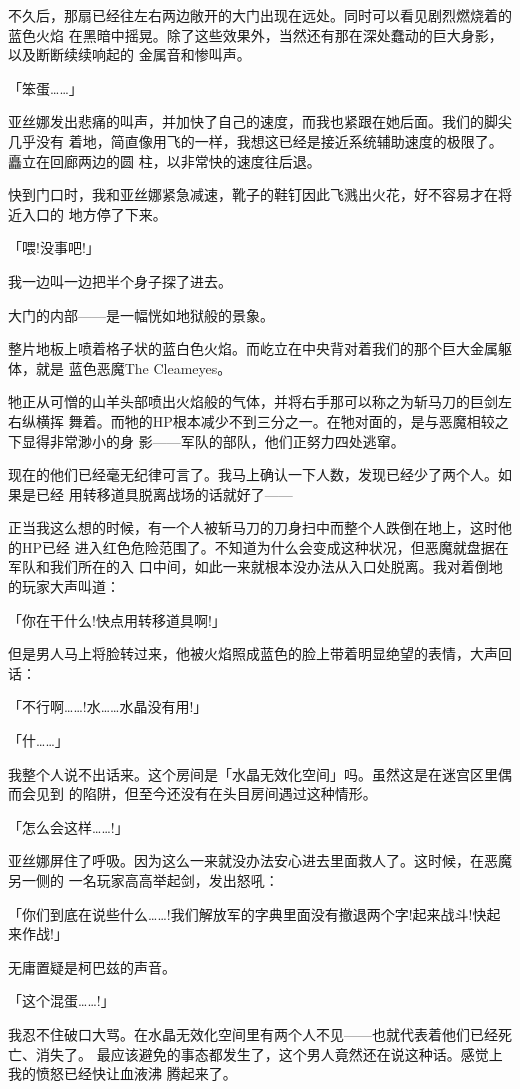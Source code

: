 \documentclass[11pt]{book}
\begin{document}
不久后，那扇已经往左右两边敞开的大门出现在远处。同时可以看见剧烈燃烧着的蓝色火焰
在黑暗中摇晃。除了这些效果外，当然还有那在深处蠢动的巨大身影，以及断断续续响起的
金属音和惨叫声。

「笨蛋……」

亚丝娜发出悲痛的叫声，并加快了自己的速度，而我也紧跟在她后面。我们的脚尖几乎没有
着地，简直像用飞的一样，我想这已经是接近系统辅助速度的极限了。矗立在回廊两边的圆
柱，以非常快的速度往后退。

快到门口时，我和亚丝娜紧急减速，靴子的鞋钉因此飞溅出火花，好不容易才在将近入口的
地方停了下来。

「喂!没事吧!」

我一边叫一边把半个身子探了进去。

大门的内部——是一幅恍如地狱般的景象。

整片地板上喷着格子状的蓝白色火焰。而屹立在中央背对着我们的那个巨大金属躯体，就是
蓝色恶魔The Cleameyes。

牠正从可憎的山羊头部喷出火焰般的气体，并将右手那可以称之为斩马刀的巨剑左右纵横挥
舞着。而牠的HP根本减少不到三分之一。在牠对面的，是与恶魔相较之下显得非常渺小的身
影——军队的部队，他们正努力四处逃窜。

现在的他们已经毫无纪律可言了。我马上确认一下人数，发现已经少了两个人。如果是已经
用转移道具脱离战场的话就好了——

正当我这么想的时候，有一个人被斩马刀的刀身扫中而整个人跌倒在地上，这时他的HP已经
进入红色危险范围了。不知道为什么会变成这种状况，但恶魔就盘据在军队和我们所在的入
口中间，如此一来就根本没办法从入口处脱离。我对着倒地的玩家大声叫道：

「你在干什么!快点用转移道具啊!」

但是男人马上将脸转过来，他被火焰照成蓝色的脸上带着明显绝望的表情，大声回话：

「不行啊……!水……水晶没有用!」

「什……」

我整个人说不出话来。这个房间是「水晶无效化空间」吗。虽然这是在迷宫区里偶而会见到
的陷阱，但至今还没有在头目房间遇过这种情形。

「怎么会这样……!」

亚丝娜屏住了呼吸。因为这么一来就没办法安心进去里面救人了。这时候，在恶魔另一侧的
一名玩家高高举起剑，发出怒吼：

「你们到底在说些什么……!我们解放军的字典里面没有撤退两个字!起来战斗!快起来作战!」

无庸置疑是柯巴兹的声音。

「这个混蛋……!」

我忍不住破口大骂。在水晶无效化空间里有两个人不见——也就代表着他们已经死亡、消失了。
最应该避免的事态都发生了，这个男人竟然还在说这种话。感觉上我的愤怒已经快让血液沸
腾起来了。
\end{document}
